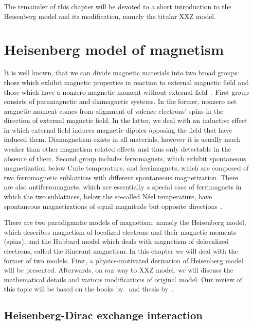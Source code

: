The remainder of this chapter will be devoted to a short introduction
to the Heisenberg model and its modification, namely the titular XXZ model.

\section{Heisenberg model of magnetism\label{sec:XXZ}}
    It is well known, that we can divide magnetic materials into two broad groups: those which
exhibit magnetic properties in reaction to external magnetic field and those which have a nonzero
magnetic moment without external field~\autocite{spalek2015}. First group consists of paramagnetic
and diamagnetic systems. In the former, nonzero net magnetic moment comes from alignment of
valence electrons' spins in the direction of external magnetic field. In the latter, we deal with
 an inductive effect in which external field induces magnetic dipoles opposing the field that have
induced them. Diamagnetism exists in all materials, however it is usually much weaker than other magnetism related
effects and thus only detectable in the absence of them. Second group includes ferromagnets, which
exhibit spontaneous magnetization below Curie temperature, and ferrimagnets, which are 
composed of two ferromagnetic sublattices with different spontaneous magnetization. There
are also antiferromagnets, which are essentially a special case of ferrimagnets in which the two sublattices,
below the so-called N{\'e}el temperature, have spontaneous magnetizations of equal magnitude
but opposite directions~\autocite{nolting2018theoretical}.

There are two paradigmatic models of magnetism, namely the Heisenberg model, which describes magnetism
of localized electrons and their magnetic moments (spins), and the Hubbard model which deals with
magnetism of delocalized electrons, called the itinerant magnetism. 
In this chapter we will deal with the former of two models.
First, a physics-motivated derivation of Heisenberg model will be presented. Afterwards,
on our way to XXZ model, we will discuss the mathematical details and various modifications
of original model. Our review of this topic will be based on the books by~\textcite{spalek2015} and 
thesis by~\textcite{Ng2011HeisenbergM}.

\subsection{Heisenberg-Dirac exchange interaction}

